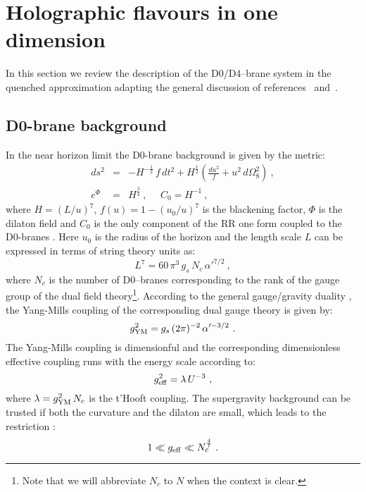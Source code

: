 \documentclass[a4paper]{jpconf}
\begin{document}
\section{Holographic flavours in one dimension}

In this section we review the description of the D0/D4--brane system  in the quenched
approximation adapting the general discussion of references~\cite{Mateos:2007vn} and~\cite{Itzhaki:1998dd}.

\subsection{D0-brane background}
%
In the near horizon limit the D0-brane background is given by the
metric:
%
\begin{eqnarray}\label{metric}
ds^2&=&-H^{-\frac{1}{2}}\,f\,dt^2+H^{\frac{1}{2}}\left(\frac{du^2}{f}+u^2\,d\Omega_8^2\right)\ ,\nonumber \\
e^{\Phi}&=&H^{\frac{3}{4}}\ ,~~~~~~C_0 =H^{-1}\ ,
\end{eqnarray}
% 
where $H=\left(L/u\right)^7$, $f(u) = 1-(u_0/u)^{7}$ is the blackening factor, $\Phi$ is the dilaton field and $C_0$ is the only component of the RR one form coupled to the D0-branes . Here $u_0$ is the radius of the horizon and the length scale $L$ can be expressed in terms of string theory units as:
%
\begin{equation}
L^7=60\,\pi^3\,g_s\,N_c\,\alpha'^{7/2}\ ,
\end{equation}
%
where $N_c$ is the number of D0--branes corresponding to the rank of the gauge group of the dual field theory\footnote{Note that we will abbreviate $N_c$ to $N$ when the context is clear.}. According to the general gauge/gravity duality \cite{Itzhaki:1998dd}, the Yang-Mills coupling of the corresponding dual gauge theory is given by:
%
\begin{equation}
g_{\rm YM}^2=g_s\,(2\pi)^{-2}\,\alpha'^{-3/2}\ .
\end{equation}
%
The Yang-Mills coupling is dimensionful and the corresponding dimensionless effective coupling runs with the energy scale according to:
\begin{equation}\label{geff}
g_{\rm eff}^2=\lambda\,U^{-3}\ ,
\end{equation}
%
where $\lambda = g_{\rm YM}^2\,N_c$ is the t'Hooft coupling. The supergravity background can be trusted if both the curvature and the dilaton are small, which leads to the restriction \cite{Itzhaki:1998dd}:
%
\begin{equation}\label{bounds}
1\ll g_{\rm eff} \ll N_c^{\frac{4}{7}}\ .
\end{equation}
\end{document}
